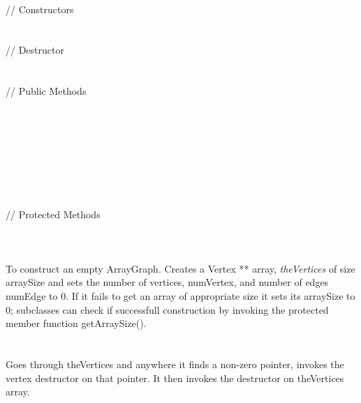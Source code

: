   \\
\indent\indent // Constructors  \\
\indent{}  \\ \\
\indent\indent // Destructor  \\
\indent{}  \\ \\
\indent\indent // Public Methods   \\
\indent{}  \\
\indent{} \\
\indent{} \\
\indent{} \\
\indent{} \\
\indent{} \\
\indent{} \\ \\
\indent\indent // Protected Methods \\
\indent{} \\


  \\
  \\
To construct an empty ArrayGraph. Creates a Vertex ** array, {\em
theVertices} of size \p arraySize and sets the number of vertices,
\p numVertex, and number of edges \p numEdge to $0$. If it fails
to get an array of appropriate size it sets its \p arraySize to
$0$; subclasses can check if successfull construction by invoking the
protected member function getArraySize(). \\

  \\
  \\
Goes through \p theVertices and anywhere it finds a non-zero pointer,
invokes the vertex destructor on that pointer. It then invokes the
destructor on theVertices array. \\


